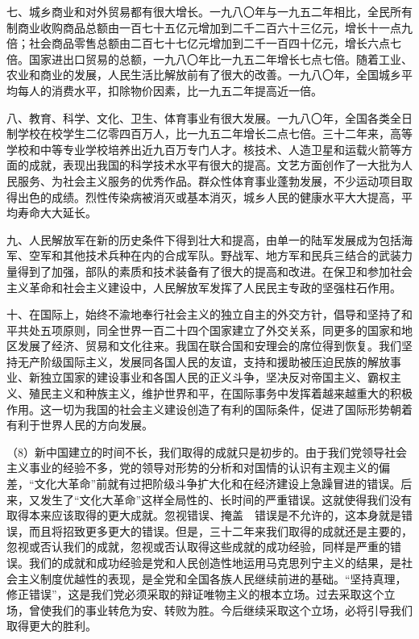 七、城乡商业和对外贸易都有很大增长。一九八〇年与一九五二年相比，全民所有制商业收购商品总额由一百七十五亿元增加到二千二百六十三亿元，增长十一点九倍；社会商品零售总额由二百七十七亿元增加到二千一百四十亿元，增长六点七倍。国家进出口贸易的总额，一九八〇年比一九五二年增长七点七倍。随着工业、农业和商业的发展，人民生活比解放前有了很大的改善。一九八〇年，全国城乡平均每人的消费水平，扣除物价因素，比一九五二年提高近一倍。

八、教育、科学、文化、卫生、体育事业有很大发展。一九八〇年，全国各类全日制学校在校学生二亿零四百万人，比一九五二年增长二点七倍。三十二年来，高等学校和中等专业学校培养出近九百万专门人才。核技术、人造卫星和运载火箭等方面的成就，表现出我国的科学技术水平有很大的提高。文艺方面创作了一大批为人民服务、为社会主义服务的优秀作品。群众性体育事业蓬勃发展，不少运动项目取得出色的成绩。烈性传染病被消灭或基本消灭，城乡人民的健康水平大大提高，平均寿命大大延长。

九、人民解放军在新的历史条件下得到壮大和提高，由单一的陆军发展成为包括海军、空军和其他技术兵种在内的合成军队。野战军、地方军和民兵三结合的武装力量得到了加强，部队的素质和技术装备有了很大的提高和改进。在保卫和参加社会主义革命和社会主义建设中，人民解放军发挥了人民民主专政的坚强柱石作用。

十、在国际上，始终不渝地奉行社会主义的独立自主的外交方针，倡导和坚持了和平共处五项原则，同全世界一百二十四个国家建立了外交关系，同更多的国家和地区发展了经济、贸易和文化往来。我国在联合国和安理会的席位得到恢复。我们坚持无产阶级国际主义，发展同各国人民的友谊，支持和援助被压迫民族的解放事业、新独立国家的建设事业和各国人民的正义斗争，坚决反对帝国主义、霸权主义、殖民主义和种族主义，维护世界和平，在国际事务中发挥着越来越重大的积极作用。这一切为我国的社会主义建设创造了有利的国际条件，促进了国际形势朝着有利于世界人民的方向发展。

（8）新中国建立的时间不长，我们取得的成就只是初步的。由于我们党领导社会主义事业的经验不多，党的领导对形势的分析和对国情的认识有主观主义的偏差，“文化大革命”前就有过把阶级斗争扩大化和在经济建设上急躁冒进的错误。后来，又发生了“文化大革命”这样全局性的、长时间的严重错误。这就使得我们没有取得本来应该取得的更大成就。忽视错误、掩盖　错误是不允许的，这本身就是错误，而且将招致更多更大的错误。但是，三十二年来我们取得的成就还是主要的，忽视或否认我们的成就，忽视或否认取得这些成就的成功经验，同样是严重的错误。我们的成就和成功经验是党和人民创造性地运用马克思列宁主义的结果，是社会主义制度优越性的表现，是全党和全国各族人民继续前进的基础。“坚持真理，修正错误”，这是我们党必须采取的辩证唯物主义的根本立场。过去采取这个立场，曾使我们的事业转危为安、转败为胜。今后继续采取这个立场，必将引导我们取得更大的胜利。

